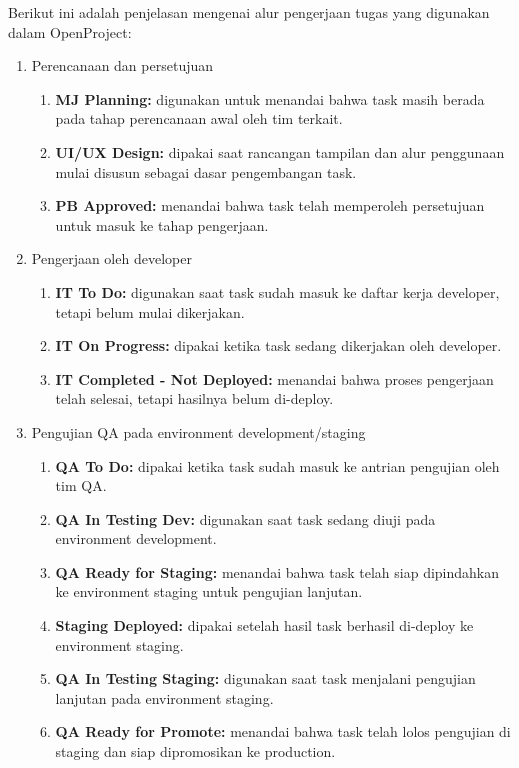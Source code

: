 Berikut ini adalah penjelasan mengenai alur pengerjaan tugas yang digunakan
dalam OpenProject:
\begin{enumerate}[label=\alph*.]
      \item Perencanaan dan persetujuan
            \begin{enumerate}[label=\arabic*), noitemsep, topsep=0pt]
                  \item \textbf{MJ Planning:} digunakan untuk menandai bahwa task masih berada pada tahap perencanaan awal oleh tim terkait.
                  \item \textbf{UI/UX Design:} dipakai saat rancangan tampilan dan alur penggunaan mulai disusun sebagai dasar pengembangan task.
                  \item \textbf{PB Approved:} menandai bahwa task telah memperoleh persetujuan untuk masuk ke tahap pengerjaan.
            \end{enumerate}

      \item Pengerjaan oleh developer
            \begin{enumerate}[label=\arabic*), noitemsep, topsep=0pt]
                  \item \textbf{IT To Do:} digunakan saat task sudah masuk ke daftar kerja developer, tetapi belum mulai dikerjakan.
                  \item \textbf{IT On Progress:} dipakai ketika task sedang dikerjakan oleh developer.
                  \item \textbf{IT Completed - Not Deployed:} menandai bahwa proses pengerjaan telah selesai, tetapi hasilnya belum di-deploy.
            \end{enumerate}

      \item Pengujian QA pada environment development/staging
            \begin{enumerate}[label=\arabic*), noitemsep, topsep=0pt]
                  \item \textbf{QA To Do:} dipakai ketika task sudah masuk ke antrian pengujian oleh tim QA.
                  \item \textbf{QA In Testing Dev:} digunakan saat task sedang diuji pada environment development.
                  \item \textbf{QA Ready for Staging:} menandai bahwa task telah siap dipindahkan ke environment staging untuk pengujian lanjutan.
                  \item \textbf{Staging Deployed:} dipakai setelah hasil task berhasil di-deploy ke environment staging.
                  \item \textbf{QA In Testing Staging:} digunakan saat task menjalani pengujian lanjutan pada environment staging.
                  \item \textbf{QA Ready for Promote:} menandai bahwa task telah lolos pengujian di staging dan siap dipromosikan ke production.
            \end{enumerate}


\end{enumerate}
